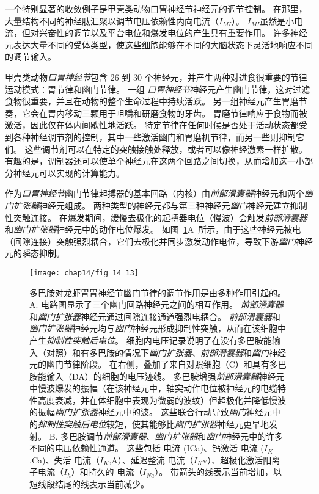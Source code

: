 一个特别显著的收敛例子是甲壳类动物口胃神经节神经元的调节控制。
在那里，大量结构不同的神经肽汇聚以调节电压依赖性内向电流（$I_{MI}$）。
$I_{MI}$虽然是小电流，但对兴奋性的调节以及平台电位和爆发电位的产生具有重要作用。
许多神经元表达大量不同的受体类型，使这些细胞能够在不同的大脑状态下灵活地响应不同的调节输入。


甲壳类动物\textit{口胃神经节}包含 26 到 30 个神经元，并产生两种对进食很重要的节律运动模式：胃节律和幽门节律。
一组 \textit{口胃神经节}神经元产生幽门节律，这对过滤食物很重要，并且在动物的整个生命过程中持续活跃。
另一组神经元产生胃磨节奏，它会在胃内移动三颗用于咀嚼和研磨食物的牙齿。
胃磨节律响应于食物而被激活，因此仅在体内间歇性地活跃。
特定节律在任何时候是否处于活动状态都受到各种神经调节剂的控制，其中一些激活幽门和胃磨机节律，而另一些则抑制它们。
这些调节剂可以在特定的突触接触处释放，或者可以像神经激素一样扩散。
有趣的是，调制器还可以使单个神经元在这两个回路之间切换，从而增加这一小部分神经元可以实现的计算能力。


作为\textit{口胃神经节}幽门节律起搏器的基本回路（内核）由\textit{前部滑囊器}神经元和两个\textit{幽门扩张器}神经元组成。
两种类型的神经元都与第三种神经元\textit{幽门}神经元建立抑制性突触连接。
在爆发期间，缓慢去极化的起搏器电位（慢波）会触发\textit{前部滑囊器}和\textit{幽门扩张器}神经元中的动作电位爆发。
如图~\ref{fig:14_13}A~所示，由于这些神经元被电（间隙连接）突触强烈耦合，它们去极化并同步激发动作电位，导致下游\textit{幽门}神经元的瞬态抑制。


\begin{figure}[htbp]
	\centering
	\texttt{[image: chap14/fig\_14\_13]}
	\caption{多巴胺对龙虾胃胃神经节幽门节律的调节作用是由多种作用引起的。
		A. 电路图显示了三个幽门回路神经元之间的相互作用。
		\textit{前部滑囊器}和\textit{幽门扩张器}神经元通过间隙连接通道强烈电耦合。
		\textit{前部滑囊器}和\textit{幽门扩张器}神经元均与\textit{幽门}神经元形成抑制性突触，从而在该细胞中产生\textit{抑制性突触后电位}。
		细胞内电压记录说明了在没有多巴胺能输入（对照）和有多巴胺的情况下\textit{幽门扩张器}、\textit{前部滑囊器}和\textit{幽门}神经元的幽门节律阶段。
		在右侧，叠加了来自对照细胞（C）和具有多巴胺能输入（DA）的细胞的电压迹线。
		多巴胺增强\textit{前部滑囊器}神经元中慢波爆发的振幅（在该神经元中，轴突动作电位被神经元的电缆特性高度衰减，并在体细胞中表现为微弱的波纹）但超极化并降低慢波的振幅\textit{幽门扩张器}神经元中的波。
		这些联合行动导致\textit{幽门}神经元中的\textit{抑制性突触后电位}较短，使其能够比\textit{幽门扩张器}神经元更早地发射\cite{eisen1984mechanism}。
		B. 多巴胺调节\textit{前部滑囊器}、\textit{幽门扩张器}和\textit{幽门}神经元中的许多不同的电压依赖性通道。
		这些包括  电流 (ICa)、钙激活  电流 ($I_K$,Ca)、失活  电流（$I_K$,A）、延迟整流  电流（$I_K$v）、超极化激活阳离子电流（$I_h$）和持久的  电流（$I_{Na}$）。
		带箭头的线表示当前增加，以短线段结尾的线表示当前减少\cite{marder2007understanding,harris2011neuromodulation}。}
	\label{fig:14_13}
\end{figure}


